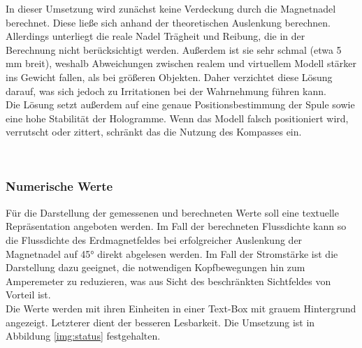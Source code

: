 In dieser Umsetzung wird zunächst keine Verdeckung durch die Magnetnadel berechnet. Diese ließe sich anhand der theoretischen Auslenkung berechnen. Allerdings unterliegt die reale Nadel Trägheit und Reibung, die in der Berechnung nicht berücksichtigt werden. Außerdem ist sie sehr schmal (etwa 5 mm breit), weshalb Abweichungen zwischen realem und virtuellem Modell stärker ins Gewicht fallen, als bei größeren Objekten. Daher verzichtet diese Lösung darauf, was sich jedoch zu Irritationen bei der Wahrnehmung führen kann.\\
\noindent\hspace*{5mm}
Die Lösung setzt außerdem auf eine genaue Positionsbestimmung der Spule sowie eine hohe Stabilität der Hologramme. Wenn das Modell falsch positioniert wird, verrutscht oder zittert, schränkt das die Nutzung des Kompasses ein.

\vspace{8px}
\begin{center}
	\\
\end{center}
\vspace{6px}

\subsubsection{Numerische Werte}
\label{sec-4-2-5}
Für die Darstellung der gemessenen und berechneten Werte soll eine textuelle Repräsentation angeboten werden. Im Fall der berechneten Flussdichte kann so die Flussdichte des Erdmagnetfeldes bei erfolgreicher Auslenkung der Magnetnadel auf 45° direkt abgelesen werden. Im Fall der Stromstärke ist die Darstellung dazu geeignet, die notwendigen Kopfbewegungen hin zum Amperemeter zu reduzieren, was aus Sicht des beschränkten Sichtfeldes von Vorteil ist.\\
\noindent\hspace*{5mm}
Die Werte werden mit ihren Einheiten in einer Text-Box mit grauem Hintergrund angezeigt. Letzterer dient der besseren Lesbarkeit. Die Umsetzung ist in Abbildung \ref{img:status} festgehalten.


